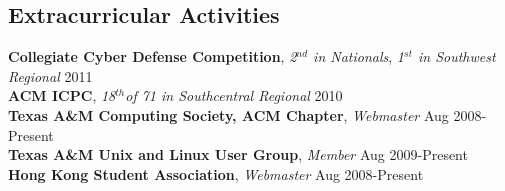 \documentclass[margin,line]{res}
\newenvironment{list2}{
  \begin{list}{$\bullet$}{%
      \setlength{\itemsep}{0in}
      \setlength{\parsep}{0in} \setlength{\parskip}{0in}
      \setlength{\topsep}{0in} \setlength{\partopsep}{0in} 
      \setlength{\leftmargin}{0.18in}}}{\end{list}}
\begin{document}
\begin{resume}
%
%
\section{\sc Extracurricular Activities}
{\bf Collegiate Cyber Defense Competition}, {\em 2$^{nd}$ in Nationals}, {\em 1$^{st}$ in Southwest Regional}  \hfill 2011 \\
{\bf ACM ICPC}, {\em 18$^{th}$of 71 in Southcentral Regional} \hfill 2010 \\
{\bf Texas A\&M Computing Society, ACM Chapter}, {\em Webmaster} \hfill Aug 2008-Present \\
{\bf Texas A\&M Unix and Linux User Group}, {\em Member} \hfill Aug 2009-Present \\
{\bf Hong Kong Student Association}, {\em Webmaster} \hfill Aug 2008-Present

%
%


%
%

\end{resume}
\end{document}
